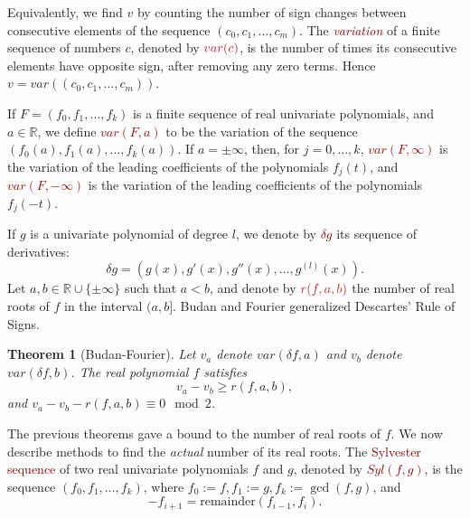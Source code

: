 \documentclass[12pt]{amsart}
\newtheorem{theorem}{Theorem}
\theoremstyle{definition}
\newcommand{\RR}{\mathbb{R}}
\begin{document}
Equivalently, we find $v$ by counting the number of sign changes between consecutive elements of the sequence $(c_{0},c_{1},\dots,c_{m})$. The \textit{\textcolor{Maroon}{variation}} of a finite sequence of numbers $c$, denoted by $\textcolor{Maroon}{var(c)}$, is the number of times its consecutive elements have opposite sign, after removing any zero terms. Hence $v = var\left((c_{0},c_{1},\dots,c_{m})\right)$.

If $F=(f_{0},f_{1},\dots,f_{k})$ is a finite sequence of real univariate polynomials, and $a\in \RR$, we define \textcolor{Maroon}{$var(F,a)$} to be the variation of the sequence $(f_{0}(a),f_{1}(a),\dots,f_{k}(a))$. If $a=\pm\infty$, then, for $j=0,\dots, k$, \textcolor{Maroon}{$var(F,\infty)$} is the variation of the leading coefficients of the polynomials $f_{j}(t)$, and \textcolor{Maroon}{$var(F,-\infty)$} is the variation of the leading coefficients of the polynomials $f_{j}(-t)$.

If $g$ is a univariate polynomial of degree $l$, we denote by \textcolor{Maroon}{$\delta g$} its sequence of derivatives: $$\delta g = \left(g(x),g'(x),g''(x),\dots,g^{(l)}(x)\right).$$ Let $a,b\in \RR\cup\{\pm \infty\}$ such that $a<b$, and denote by $\textcolor{Maroon}{r(f,a,b)}$ the number of real roots of $f$ in the interval $(a,b]$. Budan and Fourier \cite{MR2830310} generalized Descartes' Rule of Signs.

\begin{theorem}[Budan-Fourier] Let $v_{a}$ denote $var(\delta f,a)$ and $v_{b}$ denote $var(\delta f,b)$. The real polynomial $f$ satisfies $$v_{a} - v_{b} \geq r(f,a,b),$$ and $v_{a} - v_{b} - r(f,a,b) \equiv 0 \mod 2$.\end{theorem}


The previous theorems gave a bound to the number of real roots of $f$. We now describe methods to find the \textit{actual} number of its real roots. The \textcolor{Maroon}{Sylvester sequence} of two real univariate polynomials $f$ and $g$, denoted by \textcolor{Maroon}{$Syl(f,g)$}, is the sequence $\left(f_{0},f_{1},\dots,f_{k}\right)$, where $f_{0} := f, f_{1} := g, f_{k} := \gcd(f,g)$, and $$-f_{i+1} = \text{remainder}(f_{i-1},f_{i}).$$
\end{document}
